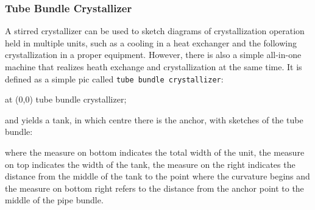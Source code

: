 \documentclass[12pt]{article}						%
\newcommand*{\chpn}[1]{\texttt{#1}}				%
\newcommand*{\chpp}[1]{\texttt{#1}}				%
\begin{document}
\subsubsection{Tube Bundle Crystallizer}

A stirred crystallizer can be used to sketch diagrams of crystallization
operation held in multiple units, such as a cooling in a heat exchanger and the
following crystallization in a proper equipment. However, there is also a simple
all-in-one machine that realizes heath exchange and crystallization at the same
time. It is defined as a simple pic called \chpp{tube bundle crystallizer}:
\begin{chpcode}
	\pic at (0,0) {tube bundle crystallizer};
\end{chpcode}
and yields a tank, in which centre there is the anchor, with sketches of the tube
bundle:
\begin{center}
\end{center}
where the measure on bottom indicates the total width of the unit, the measure on
top indicates the width of the tank, the measure on the right indicates the
distance from the middle of the tank to the point where the curvature begins and
the measure on bottom right refers to the distance from the anchor point to the
middle of the pipe bundle.
\end{document}
